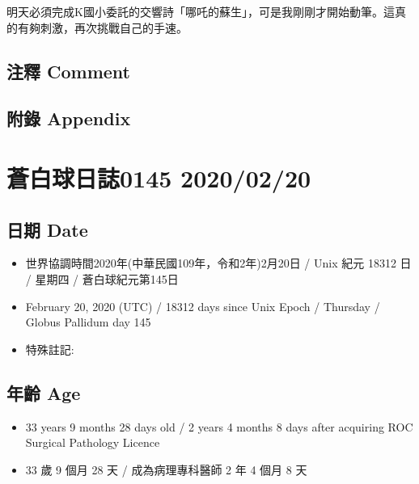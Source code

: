 \documentclass[
]{article}
\providecommand{\tightlist}{%
  \setlength{\itemsep}{0pt}\setlength{\parskip}{0pt}}
\begin{document}
明天必須完成K國小委託的交響詩「哪吒的蘇生」，可是我剛剛才開始動筆。這真的有夠刺激，再次挑戰自己的手速。

\hypertarget{ux6ce8ux91cb-comment-79}{%
\subsection{注釋 Comment}\label{ux6ce8ux91cb-comment-79}}

\hypertarget{ux9644ux9304-appendix-80}{%
\subsection{附錄 Appendix}\label{ux9644ux9304-appendix-80}}

\hypertarget{ux84bcux767dux7403ux65e5ux8a8c0145-20200220}{%
\section{蒼白球日誌0145
2020/02/20}\label{ux84bcux767dux7403ux65e5ux8a8c0145-20200220}}

\hypertarget{ux65e5ux671f-date-81}{%
\subsection{日期 Date}\label{ux65e5ux671f-date-81}}

\begin{itemize}
\tightlist
\item
  世界協調時間2020年(中華民國109年，令和2年)2月20日 / Unix 紀元 18312 日
  / 星期四 / 蒼白球紀元第145日
\item
  February 20, 2020 (UTC) / 18312 days since Unix Epoch / Thursday /
  Globus Pallidum day 145
\item
  特殊註記:
\end{itemize}

\hypertarget{ux5e74ux9f61-age-81}{%
\subsection{年齡 Age}\label{ux5e74ux9f61-age-81}}

\begin{itemize}
\tightlist
\item
  33 years 9 months 28 days old / 2 years 4 months 8 days after
  acquiring ROC Surgical Pathology Licence
\item
  33 歲 9 個月 28 天 / 成為病理專科醫師 2 年 4 個月 8 天
\end{itemize}
\end{document}

